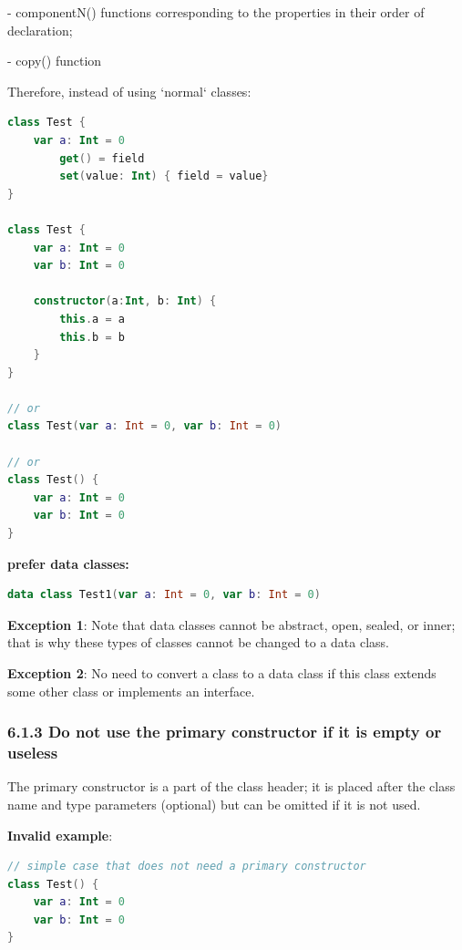 {{{{- componentN() functions corresponding to the properties in their order of declaration;

- copy() function



Therefore, instead of using `normal` classes:



\begin{lstlisting}[language=Kotlin]
class Test {
    var a: Int = 0
        get() = field
        set(value: Int) { field = value}
}

class Test {
    var a: Int = 0
    var b: Int = 0
    
    constructor(a:Int, b: Int) {
        this.a = a
        this.b = b
    }
}

// or
class Test(var a: Int = 0, var b: Int = 0)
 
// or
class Test() {
    var a: Int = 0
    var b: Int = 0
}
\end{lstlisting}


\textbf{prefer data classes:}

\begin{lstlisting}[language=Kotlin]
data class Test1(var a: Int = 0, var b: Int = 0)
\end{lstlisting}


\textbf{Exception 1}: Note that data classes cannot be abstract, open, sealed, or inner; that is why these types of classes cannot be changed to a data class.



\textbf{Exception 2}: No need to convert a class to a data class if this class extends some other class or implements an interface.



\subsubsection*{\textbf{6.1.3 Do not use the primary constructor if it is empty or useless}}
\leavevmode\newline

The primary constructor is a part of the class header; it is placed after the class name and type parameters (optional) but can be omitted if it is not used.



\textbf{Invalid example}:

\begin{lstlisting}[language=Kotlin]
// simple case that does not need a primary constructor
class Test() {
    var a: Int = 0
    var b: Int = 0
}


\end{lstlisting}}}}}
